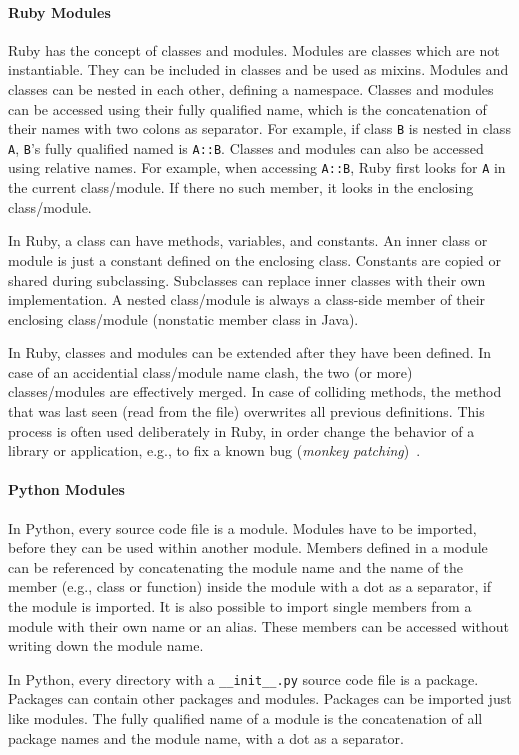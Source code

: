\paragraph{Ruby Modules}
Ruby has the concept of classes and modules. Modules are classes which are not instantiable. They can be included in classes and be used as mixins. Modules and classes can be nested in each other, defining a namespace. Classes and modules can be accessed using their fully qualified name, which is the concatenation of their names with two colons as separator. For example, if class \texttt{B} is nested in class \texttt{A}, \texttt{B}'s fully qualified named is \texttt{A::B}. Classes and modules can also be accessed using relative names. For example, when accessing \texttt{A::B}, Ruby first looks for \texttt{A} in the current class/module. If there no such member, it looks in the enclosing class/module.

In Ruby, a class can have methods, variables, and constants. An inner class or module is just a constant defined on the enclosing class. Constants are copied or shared during subclassing. Subclasses can replace inner classes with their own implementation. A nested class/module is always a class-side member of their enclosing class/module (nonstatic member class in Java).

In Ruby, classes and modules can be extended after they have been defined. In case of an accidential class/module name clash, the two (or more) classes/modules are effectively merged. In case of colliding methods, the method that was last seen (read from the file) overwrites all previous definitions. This process is often used deliberately in Ruby, in order change the behavior of a library or application, e.g., to fix a known bug (\emph{monkey patching})~\cite{Benson:2008:AR:1386543}. 

\paragraph{Python Modules}
In Python, every source code file is a module. Modules have to be imported, before they can be used within another module. Members defined in a module can be referenced by concatenating the module name and the name of the member (e.g., class or function) inside the module with a dot as a separator, if the module is imported. It is also possible to import single members from a module with their own name or an alias. These members can be accessed without writing down the module name.

In Python, every directory with a \texttt{\_\_init\_\_.py} source code file is a package. Packages can contain other packages and modules. Packages can be imported just like modules. The fully qualified name of a module is the concatenation of all package names and the module name, with a dot as a separator.

